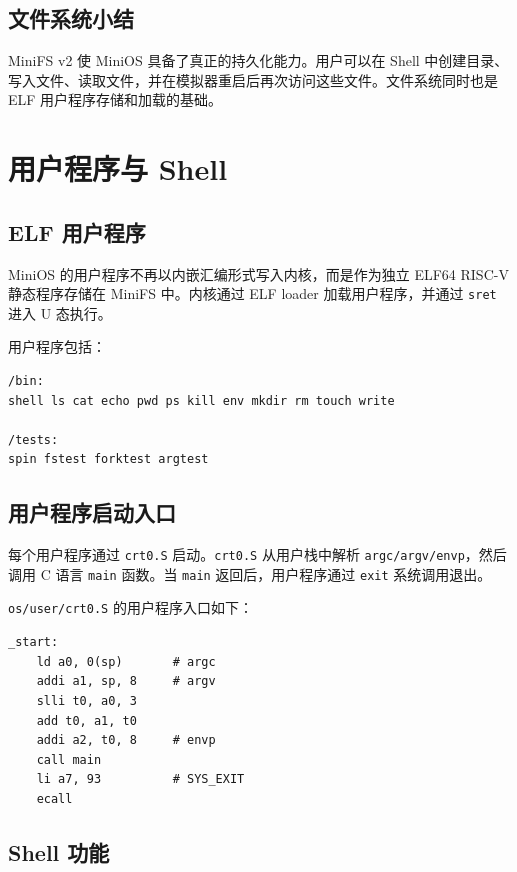 \documentclass[UTF8,a4paper,12pt,openany,fontset=fandol]{ctexrep}
\begin{document}
\section{文件系统小结}

MiniFS v2 使 MiniOS 具备了真正的持久化能力。用户可以在 Shell 中创建目录、写入文件、读取文件，并在模拟器重启后再次访问这些文件。文件系统同时也是 ELF 用户程序存储和加载的基础。

\chapter{用户程序与 Shell}

\section{ELF 用户程序}

MiniOS 的用户程序不再以内嵌汇编形式写入内核，而是作为独立 ELF64 RISC-V 静态程序存储在 MiniFS 中。内核通过 ELF loader 加载用户程序，并通过 \nolinkurl{sret} 进入 U 态执行。

用户程序包括：

\begin{lstlisting}
/bin:
shell ls cat echo pwd ps kill env mkdir rm touch write

/tests:
spin fstest forktest argtest
\end{lstlisting}

\section{用户程序启动入口}

每个用户程序通过 \nolinkurl{crt0.S} 启动。\nolinkurl{crt0.S} 从用户栈中解析 \nolinkurl{argc/argv/envp}，然后调用 C 语言 \nolinkurl{main} 函数。当 \nolinkurl{main} 返回后，用户程序通过 \nolinkurl{exit} 系统调用退出。

\nolinkurl{os/user/crt0.S} 的用户程序入口如下：

\begin{lstlisting}
_start:
    ld a0, 0(sp)       # argc
    addi a1, sp, 8     # argv
    slli t0, a0, 3
    add t0, a1, t0
    addi a2, t0, 8     # envp
    call main
    li a7, 93          # SYS_EXIT
    ecall
\end{lstlisting}

\section{Shell 功能}
\end{document}
